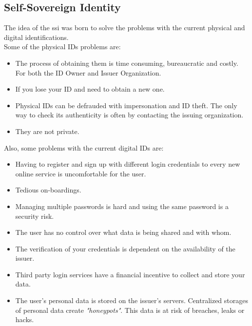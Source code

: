 \documentclass[a4paper, 12pt]{article} %
\begin{document}
        
        \subsection{Self-Sovereign Identity}
            The idea of the \acrlong{ssi} was born to solve the problems with the current physical and digital identifications.\\
            Some of the physical IDs problems are:
            \begin{itemize}
                \item The process of obtaining them is time consuming, bureaucratic and costly. For both the ID Owner and Issuer Organization. 
                \item If you lose your ID and need to obtain a new one.
                \item Physical IDs can be defrauded with impersonation and ID theft. The only way to check its authenticity is often by contacting the issuing organization.
                \item They are not private.
            \end{itemize}
            Also, some problems with the current digital IDs are:
            \begin{itemize}
                \item Having to register and sign up with different login credentials to every new online service is uncomfortable for the user. 
                \item Tedious on-boardings.
                \item Managing multiple passwords is hard and using the same password is a security risk.
                \item The user has no control over what data is being shared and with whom.
                \item The verification of your credentials is dependent on the availability of the issuer.
                \item Third party login services have a financial incentive to collect and store your data.
                \item The user's personal data is stored on the issuer's servers. Centralized storages of personal data create \textit{"honeypots"}. This data is at risk of breaches, leaks or hacks.
            \end{itemize}
\end{document}
